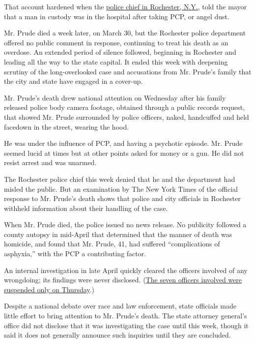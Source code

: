 That account hardened when the
\href{https://www.nytimes3xbfgragh.onion/2020/09/08/nyregion/rochester-police-chief-resigns-prude.html}{police
chief in Rochester, N.Y.,} told the mayor that a man in custody was in
the hospital after taking PCP, or angel dust.

Mr. Prude died a week later, on March 30, but the Rochester police
department offered no public comment in response, continuing to treat
his death as an overdose. An extended period of silence followed,
beginning in Rochester and leading all the way to the state capital. It
ended this week with deepening scrutiny of the long-overlooked case and
accusations from Mr. Prude's family that the city and state have engaged
in a cover-up.

Mr. Prude's death drew national attention on Wednesday after his family
released police body camera footage, obtained through a public records
request, that showed Mr. Prude surrounded by police officers, naked,
handcuffed and held facedown in the street, wearing the hood.

He was under the influence of PCP, and having a psychotic episode. Mr.
Prude seemed lucid at times but at other points asked for money or a
gun. He did not resist arrest and was unarmed.

The Rochester police chief this week denied that he and the department
had misled the public. But an examination by The New York Times of the
official response to Mr. Prude's death shows that police and city
officials in Rochester withheld information about their handling of the
case.

When Mr. Prude died, the police issued no news release. No publicity
followed a county autopsy in mid-April that determined that the manner
of death was homicide, and found that Mr. Prude, 41, had suffered
``complications of asphyxia,'' with the PCP a contributing factor.

An internal investigation in late April quickly cleared the officers
involved of any wrongdoing; its findings were never disclosed.
(\href{https://www.nytimes3xbfgragh.onion/2020/09/03/nyregion/daniel-prude-police-rochester.html}{The
seven officers involved were suspended only on Thursday}.)

Despite a national debate over race and law enforcement, state officials
made little effort to bring attention to Mr. Prude's death. The state
attorney general's office did not disclose that it was investigating the
case until this week, though it said it does not generally announce such
inquiries until they are concluded.

